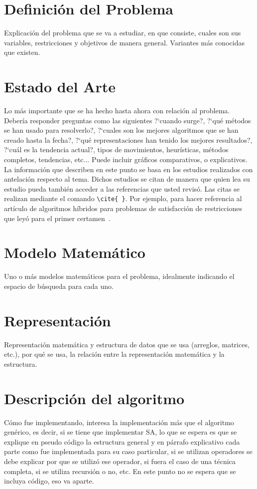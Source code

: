 \documentclass[letter, 10pt]{article}
\begin{document}
\section{Definici\'on del Problema}
Explicaci\'on del problema que se va a estudiar, en que consiste, cuales son sus variables, restricciones y objetivos de manera general. Variantes m\'as conocidas que existen.

\section{Estado del Arte}
Lo m\'as importante que se ha hecho hasta ahora con relaci\'on al problema. Deber\'ia responder preguntas como las siguientes ?`cuando surge?, ?`qu\'e m\'etodos se han usado para resolverlo?, ?`cuales son los mejores algoritmos que se han creado hasta la fecha?, ?`qu\'e representaciones han tenido los mejores resultados?, ?`cu\'al es la tendencia actual?, tipos de movimientos, heur\'isticas, m\'etodos completos, tendencias, etc... Puede incluir gr\'aficos comparativos, o explicativos.\\
La informaci\'on que describen en este punto se basa en los estudios realizados con antelaci\'on respecto al tema. Dichos estudios se citan de manera que quien lea su estudio pueda tambi\'en
 acceder a las referencias que usted revis\'o. Las citas se realizan mediante el comando \verb+\cite{ }+.
Por ejemplo, para hacer referencia al art\'iculo de algoritmos h\'ibridos para problemas de satisfacci\'on 
 de restricciones que ley\'o para el primer certamen~\cite{Prosser93Hybrid}.

\section{Modelo Matem\'atico}
Uno o m\'as modelos matem\'aticos para el problema, idealmente indicando el espacio de b\'usqueda para cada uno.

\section{Representaci\'on}
Representaci\'on matem\'atica y estructura de datos que se usa (arreglos, matrices, etc.), por qu\'e se usa, la relaci\'on entre la 
representaci\'on matem\'atica y la estructura.

\section{Descripci\'on del algoritmo}
C\'omo fue implementando, interesa la implementaci\'on m\'as que el algoritmo gen\'erico, es decir,
si se tiene que implementar SA, lo que se espera es que se explique en pseudo c\'odigo la estructura
general y en p\'arrafo explicativo cada parte como fue implementada para su caso particular, si
se utilizan operadores se debe explicar por que se utiliz\'o ese operador, si fuera el caso de una
t\'ecnica completa, si se utiliza recursi\'on o no, etc. En este punto no se espera que se incluya
c\'odigo, eso va aparte.
\end{document}
